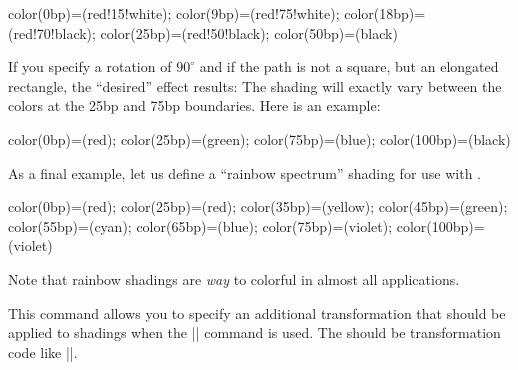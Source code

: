 \begin{command}{\pgfshadepath{}}
\begin{codeexample}[]
 {color(0bp)=(red!15!white); color(9bp)=(red!75!white);
 color(18bp)=(red!70!black); color(25bp)=(red!50!black); color(50bp)=(black)}
\hskip 1cm
\begin{pgfpicture}
  \pgfpathrectangle{\pgfpointorigin}{\pgfpoint{1cm}{1cm}}
  \pgfusepath{}
  \pgfpathcircle{\pgfpoint{3cm}{0cm}}{1cm}
  \pgfusepath{}
  \pgfpathcircle{\pgfpoint{6cm}{0cm}}{1cm}
  \pgfusepath{}
\end{pgfpicture}
\end{codeexample}

  If you specify a rotation of $90^\circ$
  and if the path is not a square, but an elongated rectangle,  the
  ``desired'' effect results: The shading will exactly vary between
  the colors at the 25bp and 75bp boundaries. Here is an example:
  
\begin{codeexample}[]
 {color(0bp)=(red); color(25bp)=(green);  color(75bp)=(blue);  color(100bp)=(black)}
\begin{pgfpicture}
  \pgfpathrectangle{\pgfpointorigin}{\pgfpoint{2cm}{1cm}}
  \pgfpathrectangle{\pgfpoint{3cm}{0cm}}{\pgfpoint{2cm}{1cm}}
  \pgfpathrectangle{\pgfpoint{6cm}{0cm}}{\pgfpoint{2cm}{1cm}}
\end{pgfpicture}
\end{codeexample}


  As a final example, let us define a ``rainbow spectrum'' shading for
  use with \tikzname.
\begin{codeexample}[]
 {color(0bp)=(red); color(25bp)=(red); color(35bp)=(yellow);
  color(45bp)=(green); color(55bp)=(cyan); color(65bp)=(blue);
  color(75bp)=(violet); color(100bp)=(violet)}
\end{codeexample}

  Note that rainbow shadings are \emph{way} to colorful in almost all
  applications. 
\end{command}

\begin{command}{\pgfsetadditionalshadetransform{}}
    This command allows you to specify an additional transformation
    that should be applied to shadings when the |\pgfshadepath|
    command is used. The  should be
    transformation code like ||.  
\end{command}

